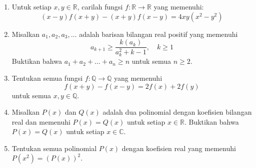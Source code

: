 \documentclass[12pt]{scrartcl}
\newcommand{\R}{\mathbb{R}}
\begin{document}
\begin{enumerate}
		\item
		Untuk setiap $x,y \in \R$, carilah fungsi $f: \R \rightarrow  \R$ yang memenuhi:
		$$(x-y)f(x+y)-(x+y)f(x-y) = 4xy(x^2-y^2)$$
		
		\item
		Misalkan $a_1,a_2,a_3,\dots$ adalah barisan bilangan real positif yang memenuhi
		\[
		a_{k+1} \geq \dfrac{k(a_k)}{a^2_k+k-1} , \quad k \geq 1
		\]
		Buktikan bahwa $a_1 + a_2 + \dots + a_n \geq n$ untuk semua $n\geq 2$.
		
		\item
		Tentukan semua fungsi $f:\mathbb{Q} \rightarrow \mathbb{Q}$ yang memenuhi
		\[
		f(x+y)-f(x-y)=2f(x)+2f(y)
		\]
		untuk semua $x,y \in \mathbb{Q}$.
		
		\item
		Misalkan $P(x)$ dan $Q(x)$ adalah dua polinomial dengan koefisien bilangan real dan memenuhi $P(x)=Q(x)$ untuk setiap $x \in \R$. Buktikan bahwa $P(x)=Q(x)$ untuk setiap $x \in \mathbb{C}$.
		
		\item
		Tentukan semua polinomial $P(x)$ dengan koefisien real yang memenuhi $P(x^2)=(P(x))^2$.
		
	\end{enumerate}
	
	
\end{document}
